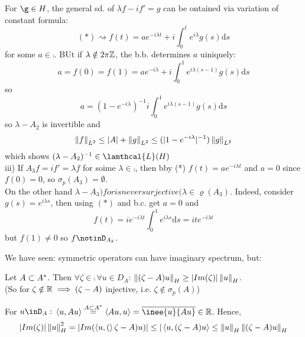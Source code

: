 \begin{example}
\begin{pf}{}{}
    For $\g\in H$, the general sd. of $\lambda f-if'=g$ can be ontained via variation of constant formula:
    $$
    (*)\rightsquigarrow f(t)=ae^{-i\lambda t}+i \int_0^t e^{i\lambda}g(s)\mathrm{d}s
    $$
    for some $a\in\comp$. BUt if $\lambda\notin2\pi\mathbb{Z}$, the b.b. determines $a$ uiniquely:
    $$
    a=f(0)=f(1)=ae^{-i\lambda}+i\int_0^1e^{i\lambda(s-1)}g(s)\mathrm{d}s$$
    so
    $$
    a=(1-e^{-i\lambda})^{-1}i\int_0^1e^{i\lambda(s-1)}g(s)\mathrm{d}s$$
    so $\lambda-A_2$ is invertible and 
    $$\left\|{f}\right\|_{L^2}\leq |A|+\left\|{g}\right\|_{L^2}\leq(|1-e^{-i\lambda}|^{-1})\left\|{g}\right\|_{L^2}$$
    which shows $(\lambda-A_2)^{-1}\in\lamthcal{L}(H)$\\
    iii) If $A_3f=if'=\lambda f$ for soime $\lambda\in\comp$, then bby (*) $f(t)=ae^{-i\lambda t}$ and $a=0$ since $f(0)=0$, so $\sigma
_p(A_3)=\emptyset$.\\
On the other hand $\lambda-A_3) for $\lambda\in\comp$ is never surjective ($\implies $\lambda\in\varrho(A_3)$. Indeed, consider $g(s)=e^{i\lambda s}$, then using $(*)$ and b.c. get $a=0$ and 
$$
f(t)=ie^{-i\lambda t}\int_0^1e^{i\lambda s} \mathrm{d}s=ite^{-i\lambda t}$$
but $f(1)\neq0$ so $f\notinD_{A_3}$.
    \end{pf}  
\end{example}

We have seen: symmetric operators can have imaginary spectrum, but:

\begin{lemma}
    Let $A\subset {A}^*$. Then $\forall\zeta\in\comp\,\forall u\in D_A$: $\left\|{(\zeta-A)u}\right\|_H\geq |Im(\zeta)|\left\|{u}\right\|_H$.\\
(So for $\zeta\notin\mathbb{R}\implies(\zeta-A)$ injective, i.e. $\zeta\notin\sigma_p(A)$)
\begin{pf}{}{}
    For $u\inD_A:$ $\inne{u}{Au}\stackrel{A\subset\dual{A}}{=}\inne{Au}{u}=\overline
{\inee{u}{Au}}\in\real$. Hence,
$$
|Im(\zeta)|\left\|{u}\right\|^2_H=|Im(\left<{u},{(}\right>\zeta-A)u)|\leq|\left<{u},{(\zeta-A)u}\right>\leq\left\|{u}\right\|_H\left\|{(\zeta-A)u}\right\|_H
$$
\end{pf}
\end{lemma}

